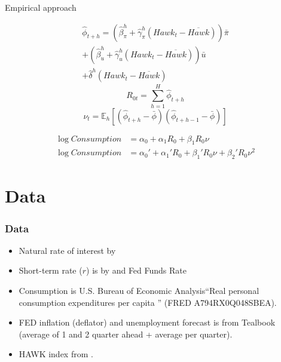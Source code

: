 \documentclass[11pt,pdf,aspectratio=129]{beamer}
\begin{document}
\begin{frame}{Empirical approach }

    \begin{multline*}\hat \phi_{t+h}=\left(\hat \beta_\pi^h+\hat\gamma^h_\pi \left(\mathit{Hawk}_{t}-\overline{\mathit{Hawk}}\right)\right)\bar\pi\\ +\left(\hat \beta_u^h+\hat\gamma^h_u \left(\mathit{Hawk}_{t}-\overline{\mathit{Hawk}}\right)\right)\bar u\\+\hat\delta^h\left(\mathit{Hawk}_{t}-\overline{\mathit{Hawk}}\right)
    \end{multline*}
    \[R_{0t}=\sum_{h=1}^{H} \hat \phi_{t+h}\]
    \[\nu_t=\mathbb{E}_{h}\left[\left(\hat\phi_{t+h}-\bar \phi\right)\left(\hat \phi_{t+h-1}-\bar \phi\right)\right]\]

    \begin{align}
        \log \mathit{Consumption}&=\alpha_0+\alpha_1 R_0+\beta_1 R_0\nu \label{eq:linear}\\
        \log \mathit{Consumption}&=\alpha_0'+\alpha_1' R_0+\beta_1' R_0\nu + \beta_2' R_0\nu^2\label{eq:quadratic}
    \end{align} 
\end{frame}






\section{Data}
\begin{frame}\frametitle{Data}
\begin{itemize}\setlength\itemsep{1em}
        \item Natural rate of interest by \citet{HLW2017,HLW2023}
        \item Short-term rate ($r$) is by \citet{WuXia2016} and Fed Funds Rate 
        \item Consumption is U.S. Bureau of Economic Analysis``Real personal consumption expenditures per capita ''  (FRED A794RX0Q048SBEA).
        \item FED inflation (deflator) and unemployment forecast is from Tealbook (average of 1 and 2 quarter ahead + average per quarter).
        \item HAWK index from \citet{HIM2023}.
    \end{itemize}
\end{frame}

    
\end{document}
